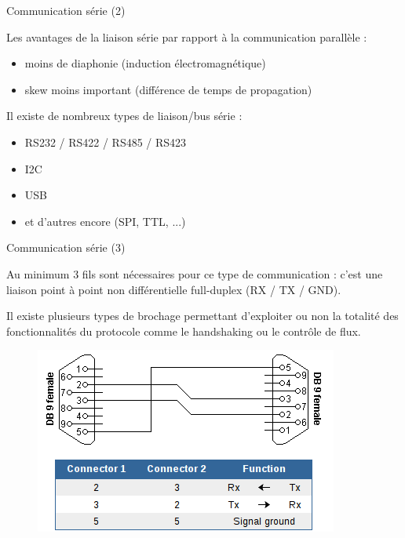 \documentclass[12pt, t]{beamer}
\newcommand{\bi}{\begin{itemize}}
\newcommand{\ei}{\end{itemize}}
\begin{document}
\begin{frame}{Communication série (2)}

    \vspace{15pt}
    Les avantages de la liaison série par rapport à la communication parallèle :
    \bi
    \itemsep5pt
    \item moins de diaphonie (induction électromagnétique)
    \item skew moins important (différence de temps de propagation)
    \ei

    {
        \vspace{15pt}
        Il existe de nombreux types de liaison/bus série :
        \bi
        \itemsep5pt
        \item RS232 / RS422 / RS485 / RS423
        \item I2C
        \item USB
        \item et d'autres encore (SPI, TTL, ...)
        \ei
    }
\end{frame}

\begin{frame}{Communication série (3)}

    \vspace{7pt}
    Au minimum 3 fils sont nécessaires pour ce type de communication : c'est une
    liaison point à point non différentielle full-duplex (RX / TX / GND).

    {
        \vspace{7pt}
        Il existe plusieurs types de brochage permettant d'exploiter ou non la
        totalité des fonctionnalités du protocole comme le handshaking ou le
        contrôle de flux.
    }

    {
        \vspace{7pt}
        \begin{figure}
            \centering
            \includegraphics[scale=0.6]{rs232-db9.png}
        \end{figure}
    }
\end{frame}
\end{document}
